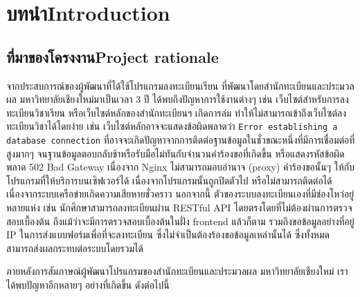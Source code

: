 \chapter{\ifcpe บทนำ\else Introduction\fi}
\label{ch:intro}

\section{\ifcpe ที่มาของโครงงาน\else Project rationale\fi}

จากประสบการณ์ของผู้พัฒนาที่ได้ใช้โปรแกรมลงทะเบียนเรียน ที่พัฒนาโดยสำนักทะเบียนและประมวลผล มหาวิทยาลัยเชียงใหม่มาเป็นเวลา 3 ปี ได้พบถึงปัญหาการใช้งานต่างๆ เช่น เว็บไซต์สำหรับการลงทะเบียนวิชาเรียน หรือเว็บไซต์หลักของสำนักทะเบียนฯ เกิดการล่ม 
ทำให้ไม่สามารถเข้าถึงเว็บไซต์ลงทะเบียนวิชาได้โดยง่าย เช่น เว็บไซต์หลักอาจจะแสดงข้อผิดพลาดว่า \texttt{Error establishing a database connection} ที่อาจจะเกิดปัญหาจากการติดต่อฐานข้อมูลในชั่วขณะหนึ่งที่มีการเชื่อมต่อที่สูงมากๆ จนฐานข้อมูลตอบกลับช้าหรือรับมือไม่ทันกับจำนวนคำร้องขอที่เกิดขึ้น หรือแสดงรหัสข้อผิดพลาด 502 Bad Gateway เนื่องจาก Nginx ไม่สามารถมอบอำนาจ (proxy) คำร้องขอนั้นๆ ให้กับโปรแกรมที่ให้บริการบนเซิฟเวอร์ได้ เนื่องจากโปรแกรมนั้นถูกปิดตัวไป หรือไม่สามารถติดต่อได้เนื่องจากระบบเครือข่ายเกิดความเสียหายชั่วคราว 
นอกจากนี้ ตัวของระบบลงทะเบียนเองที่มีช่องโหว่อยู่หลายแห่ง เช่น นักศึกษาสามารถลงทะเบียนผ่าน RESTful API โดยตรงโดยที่ไม่ต้องผ่านการตรวจสอบเบื้องต้น ถึงแม้ว่าจะมีการตรวจสอบเบื้องต้นในฝั่ง frontend แล้วก็ตาม รวมถึงขอข้อมูลอย่างที่อยู่ IP ในการส่งแบบฟอร์มเพื่อที่จะลงทะเบียน ซึ่งไม่จำเป็นต้องร้องขอข้อมูลเหล่านั้นได้ ซึ่งทั้งหมดสามารถส่งผลกระทบต่อระบบโดยรวมได้

ภายหลังการสัมภาษณ์ผู้พัฒนาโปรแกรมของสำนักทะเบียนและประมวลผล มหาวิทยาลัยเชียงใหม่ เราได้พบปัญหาอีกหลายๆ อย่างที่เกิดขึ้น ดังต่อไปนี้

